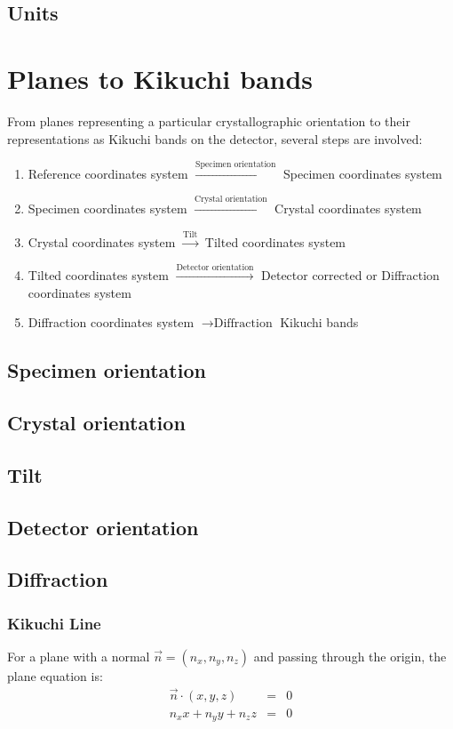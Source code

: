 \documentclass[letterpaper]{article}
\begin{document}
	\subsection{Units}
	
	\section{Planes to Kikuchi bands}
	From planes representing a particular crystallographic orientation to their representations as Kikuchi bands on the detector, several steps are involved:
	\begin{enumerate}
		\item Reference coordinates system $\xrightarrow{\text{Specimen orientation}}$ Specimen coordinates system
		\item Specimen coordinates system $\xrightarrow{\text{Crystal orientation}}$ Crystal coordinates system
		\item Crystal coordinates system $\xrightarrow{\text{Tilt}}$ Tilted coordinates system
		\item Tilted coordinates system $\xrightarrow{\text{Detector orientation}}$ Detector corrected or Diffraction coordinates system
		\item Diffraction coordinates system $\rightarrow{\text{Diffraction}}$ Kikuchi bands
	\end{enumerate}
	
	\subsection{Specimen orientation}
	
	
	\subsection{Crystal orientation}
	
	\subsection{Tilt}
	
	
	\subsection{Detector orientation}
	
	\subsection{Diffraction}
	\subsubsection{Kikuchi Line}
	For a plane with a normal $\vec{n} = (n_x, n_y, n_z)$ and passing through the origin, the plane equation is:
	\begin{eqnarray}
		\vec{n} \cdot (x,y,z) & = & 0\\\nonumber
		n_xx + n_yy + n_zz & = & 0 
		\label{eq:plane}
	\end{eqnarray}
	
\end{document}
